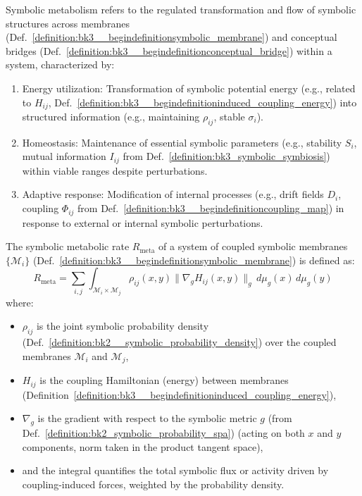 \begin{definition} \label{definition:bk3__begindefinitionsymbolic_metabolism}
Symbolic metabolism refers to the regulated transformation and flow of symbolic structures across membranes (Def.~\ref{definition:bk3__begindefinitionsymbolic_membrane}) and conceptual bridges (Def.~\ref{definition:bk3__begindefinitionconceptual_bridge}) within a system, characterized by:
\begin{enumerate}
    \item Energy utilization: Transformation of symbolic potential energy (e.g., related to $H_{ij}$, Def.~\ref{definition:bk3__begindefinitioninduced_coupling_energy}) into structured information (e.g., maintaining $\rho_{ij}$, stable $\sigma_i$).
    \item Homeostasis: Maintenance of essential symbolic parameters (e.g., stability $S_i$, mutual information $I_{ij}$ from Def.~\ref{definition:bk3_symbolic_symbiosis}) within viable ranges despite perturbations.
    \item Adaptive response: Modification of internal processes (e.g., drift fields $D_i$, coupling $\Phi_{ij}$ from Def.~\ref{definition:bk3__begindefinitioncoupling_map}) in response to external or internal symbolic perturbations.
\end{enumerate}
\end{definition}

\begin{definition} \label{definition:bk3__begindefinitionsymbolic_metabolic_rate}
The symbolic metabolic rate $R_{\text{meta}}$ of a system of coupled symbolic membranes $\{\mathcal{M}_i\}$ (Def.~\ref{definition:bk3__begindefinitionsymbolic_membrane}) is defined as:
\[
R_{\text{meta}} = \sum_{i,j} \int_{\mathcal{M}_i \times \mathcal{M}_j} \rho_{ij}(x,y) \|\nabla_g H_{ij}(x,y)\|_g \, d\mu_g(x) \, d\mu_g(y)
\]
where:
\begin{itemize}
    \item $\rho_{ij}$ is the joint symbolic probability density (Def.~\ref{definition:bk2__symbolic_probability_density}) over the coupled membranes $\mathcal{M}_i$ and $\mathcal{M}_j$,
    \item $H_{ij}$ is the coupling Hamiltonian (energy) between membranes (Definition~\ref{definition:bk3__begindefinitioninduced_coupling_energy}),
    \item $\nabla_g$ is the gradient with respect to the symbolic metric $g$ (from Def.~\ref{definition:bk2_symbolic_probability_spa}) (acting on both $x$ and $y$ components, norm taken in the product tangent space),
    \item and the integral quantifies the total symbolic flux or activity driven by coupling-induced forces, weighted by the probability density.
\end{itemize}
\end{definition}

